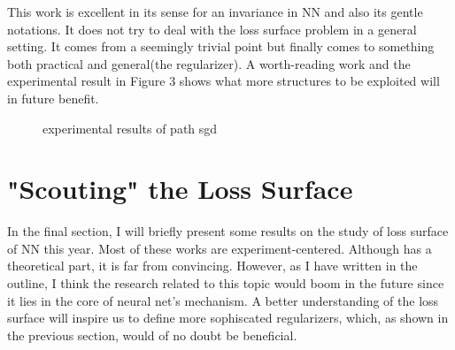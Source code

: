 \documentclass[10pt,a4paper]{article}
\begin{document}
This work is excellent in its sense for an invariance in NN and also its gentle notations. It does not try to deal with the loss surface problem in a general setting. It comes from a seemingly trivial point but finally comes to something both practical and general(the regularizer). A worth-reading work and the experimental result in Figure 3 shows what more structures to be exploited will in future benefit.

\begin{figure}[htb]
       \caption{\label{fig:c-label} experimental results of path sgd}
\end{figure}


\section{"Scouting" the Loss Surface\cite{Poggio2017}\cite{Zhang2017}\cite{Gamst2017}}
In the final section, I will briefly present some results on the study of loss surface of NN this year. Most of these works are experiment-centered. Although \cite{Poggio2017} has a theoretical part, it is far from convincing. However, as I have written in the outline, I think the research related to this topic would boom in the future since it lies in the core of neural net's mechanism. A better understanding of the loss surface will inspire us to define more sophiscated regularizers, which, as shown in the previous section, would of no doubt be beneficial.
\end{document}
